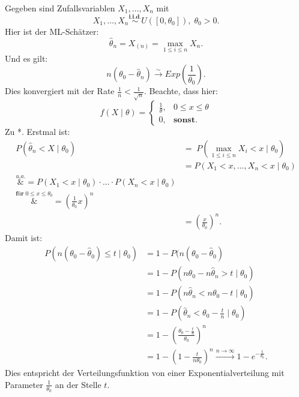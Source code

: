 \documentclass[10pt]{article}
\newcommand{\FZV}{X_1, \ldots, X_n} %
\newcommand{\KV}{\overset{\sim} \longrightarrow} %
\newcommand{\eqname}[1]{\tag*{#1}}%
\newenvironment{BSP}[1][]
{\begin{Beispiel}[frametitle=#1]}{\end{Beispiel}}
\begin{document}
	\begin{BSP}[Beispiel 1.3.11 (Grenzverteilung keine Normalverteilung)]
		Gegeben sind Zufallsvariablen $\FZV$ mit
		\begin{equation*}
			\FZV \overset{\textbf{i.i.d.}}{\sim} U([0,\theta_0]), \; \theta_0 >0.
		\end{equation*}
		Hier ist der ML-Schätzer:
		\begin{equation*}
			\hat{\theta}_n = X_{(n)} = \underset{1\leq i \leq n}{\max} X_n. 
		\end{equation*}
		Und es gilt:
		\begin{equation*}
			n(\theta_0-\hat{\theta}_n) \KV Exp\left(\frac{1}{\theta_0}\right) \eqname{*}.
		\end{equation*}
		Dies konvergiert mit der Rate $\frac{1}{n} < \frac{1}{\sqrt{n}}$.
		Beachte, dass hier:
		\begin{equation*}
			f(X\mid \theta) =
			\begin{cases}
				\frac{1}{\theta}, &0\leq x\leq \theta\\
				0, &\textbf{sonst}.
			\end{cases}
		\end{equation*}
		Zu *. Erstmal ist:
		\begin{equation*}
			\begin{split}
				P(\hat{\theta}_n < X \mid \theta_0) &= \; P(\underset{1\leq i \leq n}{\max} X_i < x \mid \theta_0)\\
				&= P(X_1 < x, \ldots, X_n < x \mid \theta_0)\\
				\overset{u.a.}&{=} P(X_1<x\mid \theta_0) \cdot \ldots \cdot P(X_n < x \mid \theta_0)\\
				\overset{\textbf{für} \; 0 \leq x \leq \theta_0}&{=} \left(\frac{1}{\theta_0}x\right)^{n}\\
				&=\left(\frac{x}{\theta_0}\right)^n.
			\end{split}
		\end{equation*}
		Damit ist:
		\begin{equation*}
			\begin{split}
				P (n(\theta_0 -\hat{\theta}_0) \leq t \mid \theta_0) &= 1-P(n(\theta_0 -\hat{\theta}_0) \\
				&= 1- P(n \theta_0 -n\hat{\theta}_n > t \mid \theta_0)\\
				&= 1- P(n\hat{\theta}_n < n\theta_0 - t \mid \theta_0)\\
				&= 1- P\left(\hat{\theta}_n < \theta_0 - \frac{t}{n} \mid \theta_0 \right)\\
				&= 1- \left(\frac{\theta_0 -\frac{t}{n}}{\theta_0}\right)^n\\
				&= 1- \left(1-\frac{t}{n \theta_0}\right)^n \overset{n\rightarrow \infty}\longrightarrow 1-e^{-\frac{t}{\theta_0}}.
			\end{split}
		\end{equation*}
		Dies entspricht der Verteilungsfunktion von einer Exponentialverteilung mit Parameter $\frac{1}{\theta_0}$ an der Stelle $t$.
		

\end{BSP}
\end{document}
